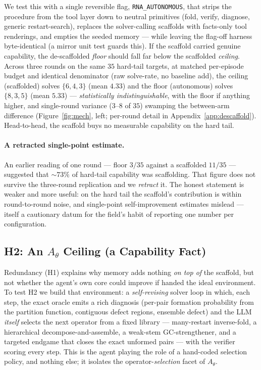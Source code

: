 \documentclass[11pt]{article}
\newcommand{\Ath}{A_{\theta}}
\begin{document}
We test this with a single reversible flag, \texttt{RNA\_AUTONOMOUS}, that strips the procedure from the
tool layer down to neutral primitives (fold, verify, diagnose, generic restart-search), replaces the
solver-calling scaffolds with facts-only tool renderings, and empties the seeded memory --- while
leaving the flag-off harness byte-identical (a mirror unit test guards this). If the scaffold carried
genuine capability, the de-scaffolded \emph{floor} should fall far below the scaffolded \emph{ceiling}.
Across three rounds on the same $35$ hard-tail targets, at matched per-episode budget and identical
denominator (raw solve-rate, no baseline add), the ceiling (scaffolded) solves $\{6,4,3\}$ (mean
$4.33$) and the floor (autonomous) solves $\{8,3,5\}$ (mean
$5.33$)%
--- \emph{statistically indistinguishable}, with the floor if anything higher, and single-round variance
($3$--$8$ of $35$) swamping the between-arm difference (Figure~\ref{fig:mech}, left; per-round detail in
Appendix~\ref{app:descaffold}). Head-to-head, the scaffold buys no measurable capability on the hard
tail.

\paragraph{A retracted single-point estimate.} An earlier reading of one round --- floor $3/35$ against
a scaffolded $11/35$ --- suggested that $\sim\!73\%$ of hard-tail capability was scaffolding. That figure
does not survive the three-round replication and we \emph{retract} it. The honest statement is
weaker and more useful: on the hard tail the scaffold's contribution is within round-to-round noise, and
single-point self-improvement estimates mislead --- itself a cautionary datum for the field's habit of
reporting one number per configuration.

\subsection{H2: An $\Ath$ Ceiling (a Capability Fact)}\label{sec:h2}
Redundancy (H1) explains why memory adds nothing \emph{on top of} the scaffold, but not whether the
agent's own core could improve if handed the ideal environment. To test H2 we build that environment: a
\emph{self-revising} solver loop in which, each step, the exact oracle emits a rich diagnosis (per-pair
formation probability from the partition function, contiguous defect regions, ensemble defect) and the
LLM \emph{itself} selects the next operator from a fixed library --- many-restart inverse-fold, a
hierarchical decompose-and-assemble, a weak-stem GC-strengthener, and a targeted endgame that closes the
exact unformed pairs --- with the verifier scoring every step. This is the agent playing the role of a
hand-coded selection policy, and nothing else; it isolates the operator-\emph{selection} facet of $\Ath$.
\end{document}
